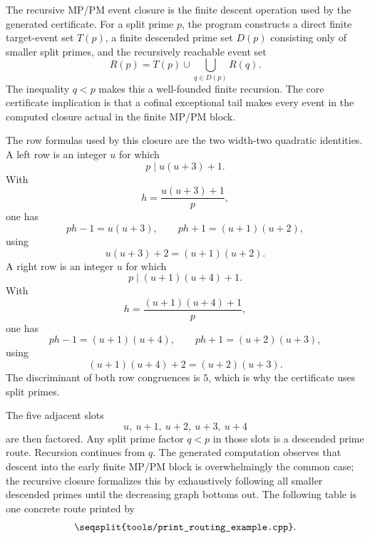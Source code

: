 \documentclass[11pt]{article}
\newcommand{\Code}[1]{\texttt{\seqsplit{#1}}}
\begin{document}
The recursive MP/PM event closure is the finite descent operation used by the
generated certificate.  For a split prime \(p\), the program constructs a direct
finite target-event set \(T(p)\), a finite descended prime set \(D(p)\)
consisting only of smaller split primes, and the recursively reachable event
set
\[
  R(p)=T(p)\cup \bigcup_{q\in D(p)}R(q).
\]
The inequality \(q<p\) makes this a well-founded finite recursion.  The core
certificate implication is that a cofinal exceptional tail makes every event
in the computed closure actual in the finite MP/PM block.

The row formulas used by this closure are the two width-two quadratic
identities.  A left row is an integer \(u\) for which
\[
  p\mid u(u+3)+1.
\]
With
\[
  h=\frac{u(u+3)+1}{p},
\]
one has
\[
  ph-1=u(u+3),\qquad ph+1=(u+1)(u+2),
\]
using
\[
  u(u+3)+2=(u+1)(u+2).
\]
A right row is an integer \(u\) for which
\[
  p\mid (u+1)(u+4)+1.
\]
With
\[
  h=\frac{(u+1)(u+4)+1}{p},
\]
one has
\[
  ph-1=(u+1)(u+4),\qquad ph+1=(u+2)(u+3),
\]
using
\[
  (u+1)(u+4)+2=(u+2)(u+3).
\]
The discriminant of both row congruences is \(5\), which is why the certificate
uses split primes.

The five adjacent slots
\[
  u,\ u+1,\ u+2,\ u+3,\ u+4
\]
are then factored.  Any split prime factor \(q<p\) in those slots is a
descended prime route.  Recursion continues from \(q\).  The generated computation
observes that descent into the early finite MP/PM block is overwhelmingly the
common case; the recursive closure formalizes this by exhaustively following
all smaller descended primes until the decreasing graph bottoms out.  The following
table is one concrete route printed by
\[
  \Code{tools/print\_routing\_example.cpp}.
\]

\begin{center}
\end{center}
\end{document}
